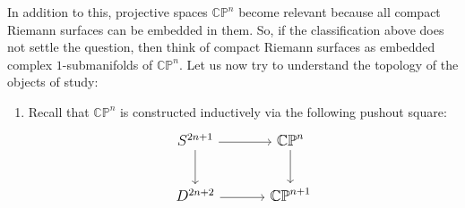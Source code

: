\documentclass[11pt,a4paper]{article}
\begin{document}

In addition to this, projective spaces $\mathbb{CP}^n$ become relevant because all compact Riemann surfaces can be embedded in them. So, if the classification above does not settle the question, then think of compact Riemann surfaces as embedded complex $1$-submanifolds of $\mathbb{CP}^n$. Let us now try to understand the topology of the objects of study:


\begin{enumerate}
    \item Recall that $\mathbb{CP}^n$ is constructed inductively via the following pushout square:
\[\begin{tikzcd}[row sep=large,column sep=large,cells={nodes={font=\large}}]
	{S^{2n+1}} & {\mathbb{CP}^n} \\
	{D^{2n+2}} & {\mathbb{CP}^{n+1}}
	\arrow[from=1-1, to=1-2]
	\arrow[from=1-2, to=2-2]
	\arrow[from=1-1, to=2-1]
	\arrow[from=2-1, to=2-2]
\end{tikzcd}\]



\end{enumerate}
\end{document}
